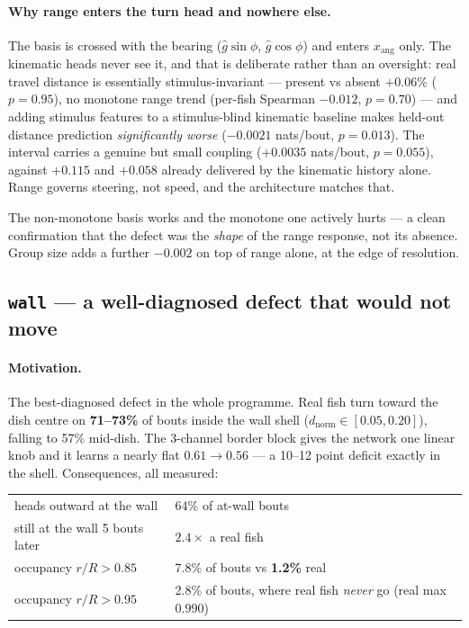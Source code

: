 \documentclass[11pt,a4paper]{article}
\begin{document}
\paragraph{Why range enters the turn head and nowhere else.}
The basis is crossed with the bearing ($\hat g\sin\phi$, $\hat g\cos\phi$) and enters
$x_{\mathrm{ang}}$ only. The kinematic heads never see it, and that is deliberate rather
than an oversight: real travel distance is essentially stimulus-invariant --- present vs
absent $+0.06\%$ ($p=0.95$), no monotone range trend (per-fish Spearman $-0.012$,
$p=0.70$) --- and adding stimulus features to a stimulus-blind kinematic baseline makes
held-out distance prediction \emph{significantly worse} ($-0.0021$ nats/bout, $p=0.013$).
The interval carries a genuine but small coupling ($+0.0035$ nats/bout, $p=0.055$), against
$+0.115$ and $+0.058$ already delivered by the kinematic history alone. Range governs
steering, not speed, and the architecture matches that.

\begin{takeaway}
The non-monotone basis works and the monotone one actively hurts --- a clean confirmation
that the defect was the \emph{shape} of the range response, not its absence. Group size
adds a further $-0.002$ on top of range alone, at the edge of resolution.
\end{takeaway}

\subsection{\texttt{wall} --- a well-diagnosed defect that would not move}

\paragraph{Motivation.}
The best-diagnosed defect in the whole programme. Real fish turn toward the dish centre
on \textbf{71--73\%} of bouts inside the wall shell ($d_{\mathrm{norm}} \in [0.05, 0.20]$),
falling to 57\% mid-dish. The 3-channel border block gives the network one linear knob and
it learns a nearly flat $0.61 \to 0.56$ --- a 10--12 point deficit exactly in the shell.
Consequences, all measured:

\begin{center}\small
\begin{tabular}{ll}
\toprule
heads outward at the wall & 64\% of at-wall bouts \\
still at the wall 5 bouts later & $2.4\times$ a real fish \\
occupancy $r/R > 0.85$ & 7.8\% of bouts vs \textbf{1.2\%} real \\
occupancy $r/R > 0.95$ & 2.8\% of bouts, where real fish \emph{never} go (real max $0.990$) \\
\bottomrule
\end{tabular}
\end{center}
\end{document}
